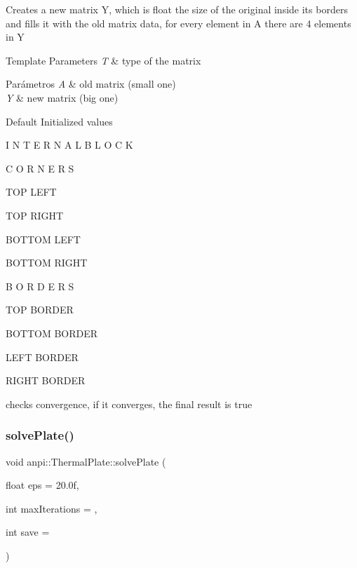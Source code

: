 Creates a new matrix Y, which is float the size of the original inside its borders and fills it with the old matrix data, for every element in A there are 4 elements in Y 
\begin{DoxyTemplParams}{Template Parameters}
{\em T} & type of the matrix \\
\hline
\end{DoxyTemplParams}

\begin{DoxyParams}{Parámetros}
{\em A} & old matrix (small one) \\
\hline
{\em Y} & new matrix (big one) \\
\hline
\end{DoxyParams}
Default Initialized values

I N T E R N A L B L O C K

C O R N E R S

T\+OP L\+E\+FT

T\+OP R\+I\+G\+HT

B\+O\+T\+T\+OM L\+E\+FT

B\+O\+T\+T\+OM R\+I\+G\+HT

B O R D E R S

T\+OP B\+O\+R\+D\+ER

B\+O\+T\+T\+OM B\+O\+R\+D\+ER

L\+E\+FT B\+O\+R\+D\+ER

R\+I\+G\+HT B\+O\+R\+D\+ER

checks convergence, if it converges, the final result is true \mbox{\label{classanpi_1_1ThermalPlate_a8f3535a477baff44346118527ff42090}} 
\subsubsection{\texorpdfstring{solve\+Plate()}{solvePlate()}}
{\footnotesize\ttfamily void anpi\+::\+Thermal\+Plate\+::solve\+Plate (\begin{DoxyParamCaption}\item[{float}]{eps = {\ttfamily 20.0f},  }\item[{int}]{max\+Iterations = {},  }\item[{int}]{save = {} }\end{DoxyParamCaption})\hspace{0.3cm}{\ttfamily [inline]}}

